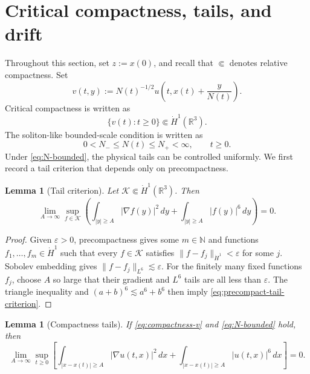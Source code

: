 \documentclass[smallextended,envcountsect,nospthms]{svjour3}
\numberwithin{equation}{section}
\theoremstyle{spbreak}
\newtheorem{lemma}[theorem]{Lemma}
\theoremstyle{spdefbreak}
\theoremstyle{spdefbreak}
\newcommand{\R}{\mathbb R}
\newcommand{\eps}{\varepsilon}
\begin{document}
\section{Critical compactness, tails, and drift}\label{sec:compactness}

Throughout this section, set $z:=x(0)$, and recall that $\Subset$ denotes relative compactness. Set
\begin{equation*}
  v(t,y):=N(t)^{-1/2}u\left(t,x(t)+\frac{y}{N(t)}\right).
\end{equation*}
Critical compactness is written as
\begin{equation}\label{eq:compactness-v}
  \{v(t):t\ge0\}\Subset\dot H^1(\R^3).
\end{equation}
The soliton-like bounded-scale condition is written as
\begin{equation}\label{eq:N-bounded}
  0<N_-\le N(t)\le N_+<\infty,
  \qquad t\ge0.
\end{equation}
Under \eqref{eq:N-bounded}, the physical tails can be controlled uniformly. We first record a tail criterion that depends only on precompactness.

\begin{lemma}[Tail criterion]\label{lem:precompact-tail-criterion}
Let $\mathcal K\Subset\dot H^1(\R^3)$. Then
\begin{equation}\label{eq:precompact-tail-criterion}
  \lim_{A\to\infty}\sup_{f\in\mathcal K}
  \left(
  \int_{|y|\ge A}|\nabla f(y)|^2\,dy
  +\int_{|y|\ge A}|f(y)|^6\,dy
  \right)=0.
\end{equation}
\end{lemma}

\begin{proof}
Given $\eps>0$, precompactness gives some $m\in\mathbb N$ and functions $f_1,\ldots,f_m\in\dot H^1$ such that every $f\in\mathcal K$ satisfies $\|f-f_j\|_{\dot H^1}<\eps$ for some $j$. Sobolev embedding gives $\|f-f_j\|_{L^6}\lesssim\eps$. For the finitely many fixed functions $f_j$, choose $A$ so large that their gradient and $L^6$ tails are all less than $\eps$. The triangle inequality and $(a+b)^6\lesssim a^6+b^6$ then imply \eqref{eq:precompact-tail-criterion}.
\end{proof}

\begin{lemma}[Compactness tails]\label{lem:compact-tail}
If \eqref{eq:compactness-v} and \eqref{eq:N-bounded} hold, then
\begin{equation}\label{eq:tail-limit}
  \lim_{A\to\infty}\sup_{t\ge0}
  \left[
  \int_{|x-x(t)|\ge A}|\nabla u(t,x)|^2\,dx
  +\int_{|x-x(t)|\ge A}|u(t,x)|^6\,dx
  \right]=0.
\end{equation}
\end{lemma}
\end{document}
